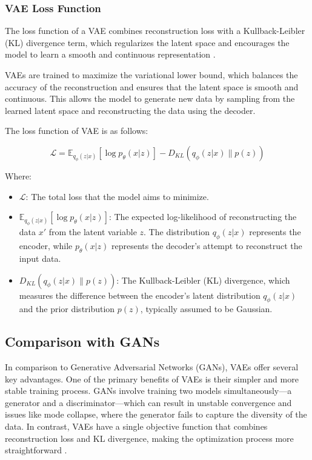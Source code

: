 \subsubsection{VAE Loss Function}
The loss function of a VAE combines reconstruction loss with a Kullback-Leibler (KL) divergence term, which regularizes the latent space and encourages the model to learn a smooth and continuous representation \citep{10.3390/jimaging4020036}.

VAEs are trained to maximize the variational lower bound, which balances the accuracy of the reconstruction and ensures that the latent space is smooth and continuous. This allows the model to generate new data by sampling from the learned latent space and reconstructing the data using the decoder.

The loss function of VAE is as follows:

\begin{equation}
\mathcal{L} = \mathbb{E}_{q_\phi(z|x)}[\log p_\theta(x|z)] - D_{KL}(q_\phi(z|x) \| p(z))
\end{equation}

Where:
\begin{itemize}
    \item \(\mathcal{L}\): The total loss that the model aims to minimize.
    \item \(\mathbb{E}_{q_\phi(z|x)}[\log p_\theta(x|z)]\): The expected log-likelihood of reconstructing the data \(x'\) from the latent variable \(z\). The distribution \(q_\phi(z|x)\) represents the encoder, while \(p_\theta(x|z)\) represents the decoder's attempt to reconstruct the input data.
    \item \(D_{KL}(q_\phi(z|x) \| p(z))\): The Kullback-Leibler (KL) divergence, which measures the difference between the encoder's latent distribution \(q_\phi(z|x)\) and the prior distribution \(p(z)\), typically assumed to be Gaussian.
\end{itemize}

\subsection{Comparison with GANs}

In comparison to Generative Adversarial Networks (GANs), VAEs offer several key advantages. One of the primary benefits of VAEs is their simpler and more stable training process. GANs involve training two models simultaneously—a generator and a discriminator—which can result in unstable convergence and issues like mode collapse, where the generator fails to capture the diversity of the data. In contrast, VAEs have a single objective function that combines reconstruction loss and KL divergence, making the optimization process more straightforward \citep{10.1561/2200000056}.

